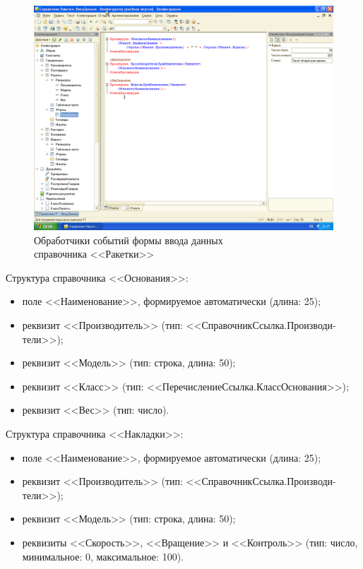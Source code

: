 \begin{figure}[h!]
  \centering
  \includegraphics[width=130mm]{pic/sprav_auto_name_module}
  \caption{Обработчики событий формы ввода данных \\ справочника <<Ракетки>>}
  \label{fig:sprav_auto_name_module}
\end{figure}

Структура справочника <<Основания>>:
\begin{itemize}
\item поле <<Наименование>>, формируемое автоматически (длина: 25);
\item реквизит <<Производитель>> (тип: <<СправочникСсылка.Производи-тели>>);
\item реквизит <<Модель>> (тип: строка, длина: 50);
\item реквизит <<Класс>> (тип: <<ПеречислениеСсылка.КлассОснования>>);
\item реквизит <<Вес>> (тип: число).
\end{itemize}

Структура справочника <<Накладки>>:
\begin{itemize}
\item поле <<Наименование>>, формируемое автоматически (длина: 25);
\item реквизит <<Производитель>> (тип: <<СправочникСсылка.Производи-тели>>);
\item реквизит <<Модель>> (тип: строка, длина: 50);
\item реквизиты <<Скорость>>, <<Вращение>> и <<Контроль>>
  (тип: число, минимальное: 0, максимальное: 100).
\end{itemize}

